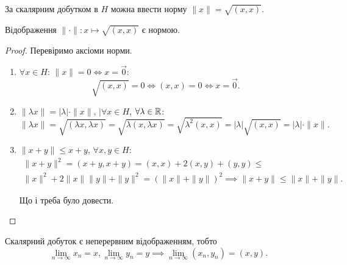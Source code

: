 За скалярним добутком в $H$ можна ввести норму $\|x\| = \sqrt{(x, x)}$.

\begin{lemma}
Відображення $\|\cdot\|: x \mapsto \sqrt{(x, x)}$ є нормою.
\end{lemma}

\begin{proof}
Перевіримо аксіоми норми.
\begin{enumerate}
\item $\forall x \in H$: $\|x\| = 0 \iff x = \vec 0$:
\begin{equation*}
    \sqrt{(x, x)} = 0 \iff (x, x) = 0 \iff x = \vec 0.
\end{equation*}

\item $\|\lambda x\| = |\lambda| \cdot \|x\|$, $|\forall x \in H$, $\forall \lambda \in \mathbb{R}$:
\begin{equation*}
    \|\lambda x\| =
    \sqrt{(\lambda x, \lambda x)} =
    \sqrt{\lambda (x, \lambda x)} =
    \sqrt{\lambda^2 (x, x)} =
    |\lambda| \sqrt{(x, x)} =
    |\lambda| \cdot \|x\|.
\end{equation*}

\item $\|x + y\| \le x + y$, $\forall x, y \in H$:
\begin{multline*}
    \|x + y\|^2 = (x + y, x + y) =
    (x, x) + 2 (x, y) + (y, y) \le \\
    \|x\|^2 + 2 \|x\| \|y\| + \|y\|^2 =
    (\|x\| + \|y\|)^2 \implies
    \|x + y\| \le \|x\| + \|y\|.
\end{multline*}

Що і треба було довести. \qedhere
\end{enumerate}
\end{proof}

\begin{lemma}
Скалярний добуток є неперервним
відображенням, тобто
\begin{equation*}
    \lim_{n \to \infty} x_n = x,
    \lim_{n \to \infty} y_n = y \implies
    \lim_{n \to \infty} (x_n, y_n) = (x, y).
\end{equation*}
\end{lemma}

